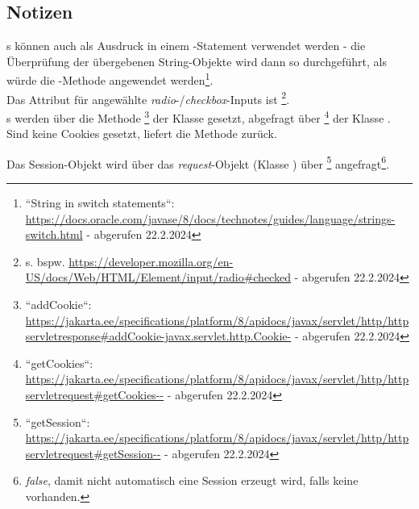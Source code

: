 \subsection{Notizen}

s können auch als Ausdruck in einem -Statement verwendet werden - die Überprüfung der übergebenen String-Objekte wird dann so durchgeführt, als würde die -Methode angewendet werden\footnote{``String in switch statements``: \url{https://docs.oracle.com/javase/8/docs/technotes/guides/language/strings-switch.html} - abgerufen 22.2.2024
}.\\


\noindent
Das Attribut für angewählte \textit{radio}-/\textit{checkbox}-Inputs ist \footnote{
s. bspw. \url{https://developer.mozilla.org/en-US/docs/Web/HTML/Element/input/radio#checked} - abgerufen 22.2.2024
}.\\

\noindent
{}s werden über die Methode \footnote{
``addCookie``: \url{https://jakarta.ee/specifications/platform/8/apidocs/javax/servlet/http/httpservletresponse#addCookie-javax.servlet.http.Cookie-} - abgerufen 22.2.2024
} der Klasse  gesetzt, abgefragt über \footnote{
``getCookies``: \url{https://jakarta.ee/specifications/platform/8/apidocs/javax/servlet/http/httpservletrequest#getCookies--} - abgerufen 22.2.2024
} der Klasse .
Sind keine Cookies gesetzt, liefert die Methode  zurück.


\noindent
Das Session-Objekt wird über das \textit{request}-Objekt (Klasse ) über \footnote{
``getSession``: \url{https://jakarta.ee/specifications/platform/8/apidocs/javax/servlet/http/httpservletrequest#getSession--} - abgerufen 22.2.2024
} angefragt\footnote{\textit{false}, damit nicht automatisch eine Session erzeugt wird, falls keine vorhanden.}.
